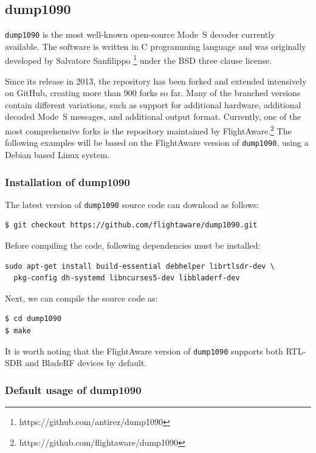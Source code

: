 \subsection{dump1090}

\texttt{dump1090} is the most well-known open-source Mode~S decoder currently available. The software is written in C programming language and was originally developed by Salvatore Sanfilippo \footnote{https://github.com/antirez/dump1090} under the BSD three clause license.

Since its release in 2013, the repository has been forked and extended intensively on GitHub, creating more than 900 forks so far. Many of the branched versions contain different variations, such as support for additional hardware, additional decoded Mode~S messages, and additional output format. Currently, one of the most comprehensive forks is the repository maintained by FlightAware.\footnote{https://github.com/flightaware/dump1090} The following examples will be based on the FlightAware version of \texttt{dump1090}, using a Debian based Linux system.

\subsubsection{Installation of dump1090}
The latest version of \texttt{dump1090} source code can download as follows:

\begin{verbatim}
$ git checkout https://github.com/flightaware/dump1090.git
\end{verbatim}

Before compiling the code, following dependencies must be installed:

\begin{verbatim}
sudo apt-get install build-essential debhelper librtlsdr-dev \
  pkg-config dh-systemd libncurses5-dev libbladerf-dev
\end{verbatim}

Next, we can compile the source code as:

\begin{verbatim}
$ cd dump1090
$ make
\end{verbatim}

It is worth noting that the FlightAware version of \texttt{dump1090} supports both RTL-SDR and BladeRF devices by default.

\subsubsection{Default usage of dump1090}

